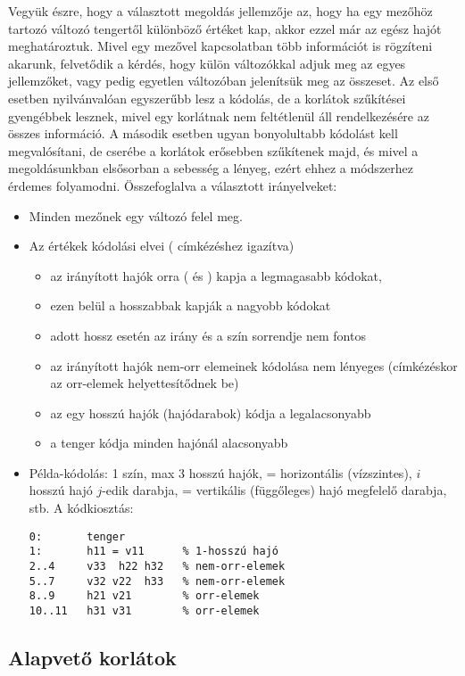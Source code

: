 Vegyük észre, hogy a választott megoldás jellemzője az, hogy ha egy mezőhöz tartozó
változó tengertől különböző értéket kap, akkor ezzel már az egész hajót meghatároztuk.
\br
Mivel egy mezővel kapcsolatban több információt is rögzíteni akarunk, felvetődik a kérdés,
hogy külön változókkal adjuk meg az egyes jellemzőket, vagy pedig egyetlen változóban
jelenítsük meg az összeset. Az első esetben nyilvánvalóan egyszerűbb lesz a kódolás,
de a korlátok szűkítései gyengébbek lesznek, mivel egy korlátnak nem feltétlenül
áll rendelkezésére az összes információ. A második esetben ugyan bonyolultabb kódolást
kell megvalósítani, de cserébe a korlátok erősebben szűkítenek majd, és mivel a
megoldásunkban elsősorban a sebesség a lényeg, ezért ehhez a módszerhez érdemes folyamodni.
\br
Összefoglalva a választott irányelveket:

\begin{itemize}
\item Minden mezőnek egy változó felel meg.
\item Az értékek kódolási elvei ( címkézéshez igazítva)
\begin{itemize}
\item az irányított hajók orra ( és ) kapja a legmagasabb
kódokat,
\item ezen belül a hosszabbak kapják a nagyobb kódokat
\item adott hossz esetén az irány és a szín sorrendje nem fontos
\item az irányított hajók nem-orr elemeinek kódolása nem lényeges (címkézéskor
az orr-elemek helyettesítődnek be)
\item az egy hosszú hajók (hajódarabok) kódja a legalacsonyabb
\item a tenger kódja minden hajónál alacsonyabb
\end{itemize}
\item Példa-kódolás: 1 szín, max 3 hosszú hajók,  = horizontális (vízszintes),
$i$ hosszú hajó $j$-edik darabja,  = vertikális (függőleges) hajó megfelelő
darabja, stb. A kódkiosztás: 

\begin{verbatim}
0:       tenger
1:       h11 = v11      % 1-hosszú hajó
2..4     v33  h22 h32   % nem-orr-elemek
5..7     v32 v22  h33   % nem-orr-elemek
8..9     h21 v21        % orr-elemek
10..11   h31 v31        % orr-elemek
\end{verbatim}
\end{itemize}

\subsection{Alapvető korlátok}


